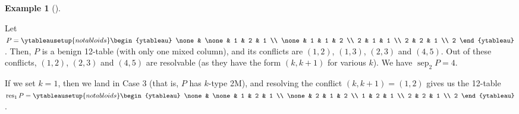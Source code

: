 \documentclass[numbers=enddot,12pt,final,onecolumn,notitlepage]{scrartcl}%
\theoremstyle{definition}
\newtheorem{exmp}[theo]{Example}
\newenvironment{example}[1][]
{\begin{exmp}[#1]\begin{leftbar}}
{\end{leftbar}\end{exmp}}
\begin{document}
\begin{example}
\label{exa.resolve}Let $P=%
\ytableausetup{notabloids}
\begin{ytableau}
\none& \none& 1 & 2 & 1 \\
\none& 1 & 1 & 2 \\
2 & 1 & 1 \\
2 & 2 & 1 \\
2
\end{ytableau}%
$. Then, $P$ is a benign 12-table (with only one mixed column), and its
conflicts are $\left(  1,2\right)  $, $\left(  1,3\right)  $, $\left(
2,3\right)  $ and $\left(  4,5\right)  $. Out of these conflicts, $\left(
1,2\right)  $, $\left(  2,3\right)  $ and $\left(  4,5\right)  $ are
resolvable (as they have the form $\left(  k,k+1\right)  $ for various $k$).
We have $\operatorname*{sep}\nolimits_{2}P=4$.

If we set $k=1$, then we land in Case 3 (that is, $P$ has $k$-type 2M), and
resolving the conflict $\left(  k,k+1\right)  =\left(  1,2\right)  $ gives us
the 12-table $\operatorname*{res}\nolimits_{1}P=%
\ytableausetup{notabloids}
\begin{ytableau}
\none& \none& 1 & 2 & 1 \\
\none& 2 & 1 & 2 \\
1 & 2 & 1 \\
2 & 2 & 1 \\
2
\end{ytableau}%
$.


\end{example}
\end{document}
